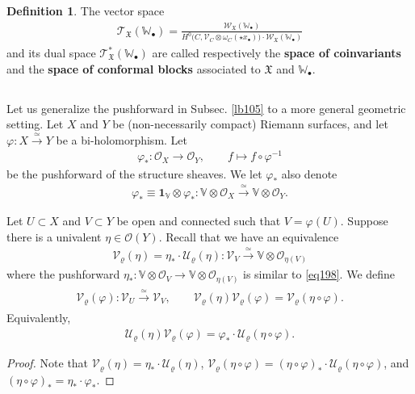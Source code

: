 \documentclass[11pt,b5paper,notitlepage]{article}
\theoremstyle{definition}
\newtheorem{df}{Definition}[section]
\theoremstyle{plain}
\newcommand{\fk}{\mathfrak}
\newcommand{\mc}{\mathcal}
\newcommand{\id}{\mathbf{1}}
\newcommand{\scr}{\mathscr}
\newcommand{\blt}{\bullet}
\newcommand{\Vbb}{\mathbb V}
\newcommand{\Wbb}{\mathbb W}
\numberwithin{equation}{section}
\begin{document}
\begin{df}
The vector space \index{T@$\scr T_{\fk X}(\Wbb_\blt),\scr T_{\fk X}^*(\Wbb_\blt)$}
\begin{align}
\scr T_{\fk X}(\Wbb_\blt)=\frac{\scr W_{\fk X}(\Wbb_\blt)}{H^0\big(C,\scr V_C\otimes\omega_C(\star x_\blt)\big)\cdot\scr W_{\fk X}(\Wbb_\blt)}
\end{align}
and its dual space $\scr T^*_{\fk X}(\Wbb_\blt)$ are called respectively  the \textbf{space of coinvariants} and the \textbf{space of conformal blocks} associated to $\fk X$ and $\Wbb_\blt$.
\end{df}



\subsection{}\label{lb128}


Let us generalize the pushforward in Subsec. \ref{lb105} to a more general geometric setting. Let $X$ and $Y$ be (non-necessarily compact)  Riemann surfaces, and let $\varphi:X\xrightarrow{\simeq}Y$ be a bi-holomorphism. Let
\begin{align}
\varphi_*:\scr O_X\rightarrow\scr O_Y,\qquad f\mapsto f\circ\varphi^{-1}
\end{align}
be the pushforward of the structure sheaves. We let $\varphi_*$ also denote
\begin{align}
\varphi_*\equiv\id_\Vbb\otimes\varphi_*:\Vbb\otimes\scr O_X\xrightarrow{\simeq}\Vbb\otimes\scr O_Y.\label{eq198}
\end{align}

Let $U\subset X$ and $V\subset Y$ be open and connected such that $V=\varphi(U)$. Suppose there is a univalent $\eta\in\scr O(Y)$. Recall that we have an equivalence
\begin{align}
\mc V_\varrho(\eta)=\eta_*\cdot\mc U_\varrho(\eta):\scr V_V\xrightarrow{\simeq}\Vbb\otimes\scr O_{\eta(V)}\label{eq201}
\end{align}
where the pushforward $\eta_*:\Vbb\otimes\scr O_V\rightarrow\Vbb\otimes\scr O_{\eta(V)}$ is similar to \eqref{eq198}. We define \index{V@$\mc V_\varrho(\eta_i),\mc V_\varrho(\varphi)$}
\begin{gather}\label{eq200}
\begin{gathered}
\mc V_\varrho(\varphi):\scr V_U\xrightarrow{\simeq}\scr V_V,\qquad \mc V_\varrho(\eta)\mc V_\varrho(\varphi)=\mc V_\varrho(\eta\circ\varphi).
\end{gathered}
\end{gather}
Equivalently,
\begin{align}
\mc U_\varrho(\eta)\mc V_\varrho(\varphi)=\varphi_*\cdot \mc U_\varrho(\eta\circ\varphi).\label{eq199}
\end{align}
\begin{proof}
Note that $\mc V_\varrho(\eta)=\eta_*\cdot \mc U_\varrho(\eta)$, $\mc V_\varrho(\eta\circ\varphi)=(\eta\circ\varphi)_*\cdot\mc U_\varrho(\eta\circ\varphi)$, and $(\eta\circ\varphi)_*=\eta_*\cdot \varphi_*$.
\end{proof}
\end{document}
